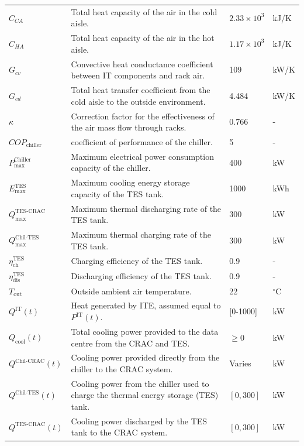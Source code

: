 \documentclass[lettersize,journal]{IEEEtran}
\begin{document}
{{\begin{longtable}{p{} p{} p{} p{}}
$C_{CA}$ & Total heat capacity of the air in the cold aisle. & $2.33 \times 10^3$ & kJ/K \\
$C_{HA}$ & Total heat capacity of the air in the hot aisle. & $1.17 \times 10^3$ & kJ/K \\
$G_{cv}$ & Convective heat conductance coefficient between IT components and rack air. & 109 &kW/K \\
$G_{cd}$ & Total heat transfer coefficient from the cold aisle to the outside environment. & 4.484 &kW/K \\
$\kappa$ & Correction factor for the effectiveness of the air mass flow through racks. & 0.766 & - \\
$COP_{\mathrm{chiller}}$ & coefficient of performance of the chiller. & 5 & - \\
$P^{\mathrm{Chiller}}_{\mathrm{max}}$ & Maximum electrical power consumption capacity of the chiller. & 400 &kW \\
$E^{\mathrm{TES}}_{\mathrm{max}}$ & Maximum cooling energy storage capacity of the TES tank. & 1000 &kWh \\
$Q^{\mathrm{TES}\text{-}\mathrm{CRAC}}_{\mathrm{max}}$ & Maximum thermal discharging rate of the TES tank. & 300 &kW \\
$Q^{\mathrm{Chil}\text{-}\mathrm{TES}}_{\mathrm{max}}$ & Maximum thermal charging rate of the TES tank. & 300 &kW \\
$\eta^{\mathrm{TES}}_{\mathrm{ch}}$ & Charging efficiency of the TES tank. & 0.9 & - \\
$\eta^{\mathrm{TES}}_{\mathrm{dis}}$ & Discharging efficiency of the TES tank. & 0.9 & - \\
$T_{\mathrm{out}}$ & Outside ambient air temperature. & 22 & $^{\circ}$C \\
$Q^{\mathrm{IT}}(t)$ & Heat generated by ITE, assumed equal to $P^{\mathrm{IT}}(t)$. & [0-1000] &kW \\
$Q_{\mathrm{cool}}(t)$ & Total cooling power provided to the data centre from the CRAC and TES. & $\geq 0$ &kW \\
$Q^{\mathrm{Chil}\text{-}\mathrm{CRAC}}(t)$ & Cooling power provided directly from the chiller to the CRAC system. & Varies &kW \\
$Q^{\mathrm{Chil}\text{-}\mathrm{TES}}(t)$ & Cooling power from the chiller used to charge the thermal energy storage (TES) tank. & $[0, 300]$ &kW \\
$Q^{\mathrm{TES}\text{-}\mathrm{CRAC}}(t)$ & Cooling power discharged by the TES tank to the CRAC system. & $[0, 300]$ &kW \\

\end{longtable}}}
\end{document}
